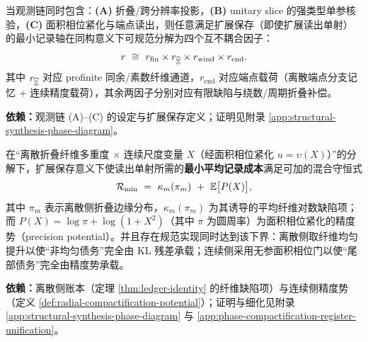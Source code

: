 \begin{theorem}[最小记录轴的规范四因子分解]\label{thm:record-axis-four-factor}
当观测链同时包含：\textbf{(A)} 折叠/跨分辨率投影，\textbf{(B)} unitary slice 的强类型单参核验，\textbf{(C)} 面积相位紧化与端点读出，则任意满足扩展保存（即使扩展读出单射）的最小记录轴在同构意义下可规范分解为四个互不耦合因子：
$$
r\ \cong\ r_{\mathrm{fin}}\times r_{\widehat{\mathbb{Z}}}\times r_{\mathrm{wind}}\times r_{\mathrm{end}}.
$$
其中 $r_{\widehat{\mathbb{Z}}}$ 对应 profinite 同余/素数纤维通道，$r_{\mathrm{end}}$ 对应端点载荷（离散端点分支记忆 $+$ 连续精度载荷），其余两因子分别对应有限缺陷与绕数/周期折叠补偿。
\par\noindent\textnormal{\textbf{依赖：}观测链 (A)--(C) 的设定与扩展保存定义；证明见附录 \ref{app:structural-synthesis-phase-diagram}。}
\end{theorem}

\begin{theorem}\label{thm:mixed-ledger-mincost}
在“离散折叠纤维多重度 $\times$ 连续尺度变量 $X$（经面积相位紧化 $u=\upsilon(X)$）”的分解下，扩展保存意义下使读出单射所需的\textnormal{\textbf{最小平均记录成本}}满足可加的混合守恒式
$$
\mathcal{R}_{\min}\ =\ \kappa_m(\pi_m)\ +\ \EE\bigl[P(X)\bigr],
$$
其中 $\pi_m$ 表示离散侧折叠边缘分布，$\kappa_m(\pi_m)$ 为其诱导的平均纤维对数缺陷项；而 $P(X)=\log\pi+\log(1+X^2)$（其中 $\pi$ 为圆周率）为面积相位紧化的精度势（precision potential）。并且存在规范实现同时达到该下界：离散侧取纤维均匀提升以使“非均匀债务”完全由 KL 残差承载；连续侧采用无参面积相位门以使“尾部债务”完全由精度势承载。
\par\noindent\textnormal{\textbf{依赖：}离散侧账本（定理 \ref{thm:ledger-identity} 的纤维缺陷项）与连续侧精度势（定义 \ref{def:radial-compactification-potential}）；证明与细化见附录 \ref{app:structural-synthesis-phase-diagram} 与 \ref{app:phase-compactification-register-unification}。}
\end{theorem}

